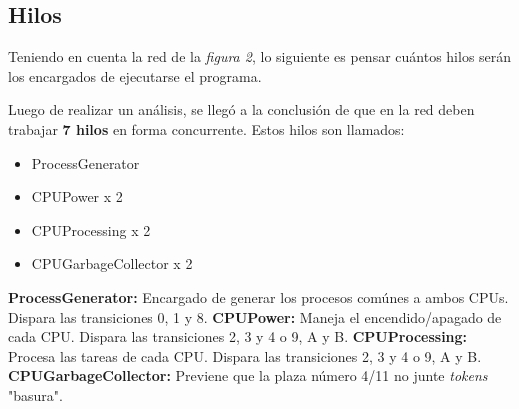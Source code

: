 \documentclass{article}
\begin{document}
    \subsection{Hilos}
    Teniendo en cuenta la red de la \emph{figura 2}, lo siguiente es pensar cuántos hilos
    serán los encargados de ejecutarse el programa. \par
    Luego de realizar un análisis, se llegó a la conclusión de que en la red deben trabajar
    \textbf{7 hilos} en forma concurrente. Estos hilos son llamados:
    \begin{itemize}
        \item ProcessGenerator
        \item CPUPower x 2
        \item CPUProcessing x 2
        \item CPUGarbageCollector x 2
    \end{itemize}
    \textbf{ProcessGenerator:} Encargado de generar los procesos comúnes a ambos CPUs.
    Dispara las transiciones 0, 1 y 8. \newline \newline
    \textbf{CPUPower:} Maneja el encendido/apagado de cada CPU. Dispara las transiciones
    2, 3 y 4 o 9, A y B. \newline \newline
    \textbf{CPUProcessing:} Procesa las tareas de cada CPU. Dispara las transiciones
    2, 3 y 4 o 9, A y B. \newline \newline
    \textbf{CPUGarbageCollector:} Previene que la plaza número 4/11 no junte \emph{tokens}
    "basura". \newline
\end{document}

